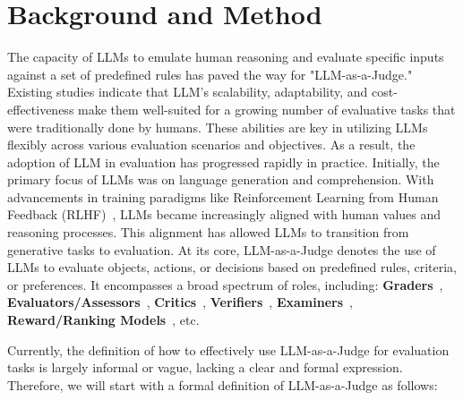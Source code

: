 \documentclass[acmsmall,screen]{acmart}
\renewcommand{\contentsname}{\centering \LARGE \textbf{Contents}}
\begin{document}








\vspace{-25pt}

\section{Background and Method}\label{sec:formulation}

The capacity of LLMs to emulate human reasoning and evaluate specific inputs against a set of predefined rules has paved the way for "LLM-as-a-Judge." Existing studies indicate that LLM's scalability, adaptability, and cost-effectiveness make them well-suited for a growing number of evaluative tasks that were traditionally done by humans. These abilities are key in utilizing LLMs flexibly across various evaluation scenarios and objectives. As a result, the adoption of LLM in evaluation has progressed rapidly in practice. Initially, the primary focus of LLMs was on language generation and comprehension. With advancements in training paradigms like Reinforcement Learning from Human Feedback (RLHF)~\cite{ouyang2022training}, LLMs became increasingly aligned with human values and reasoning processes. This alignment has allowed LLMs to transition from generative tasks to evaluation. At its core, LLM-as-a-Judge denotes the use of LLMs to evaluate objects, actions, or decisions based on predefined rules, criteria, or preferences. It encompasses a broad spectrum of roles, including:
\textbf{Graders}~\citep{trung2024reft,raft},  
\textbf{Evaluators/Assessors}~\citep{salad_bench,zhang2024evaluating},  
\textbf{Critics}~\citep{ke2024critiquellm,xiong2024llava,agentq},  
\textbf{Verifiers}~\citep{deductive_verification,nips_reflexion,speculative_rag},  
\textbf{Examiners}~\citep{lm-as-an-examiner},  
\textbf{Reward/Ranking Models}~\citep{qwen-math-reward-model,llava_rlhf,wizardmath,yuan2023rrhf}, etc.






Currently, the definition of how to effectively use LLM-as-a-Judge for evaluation tasks is largely informal or vague, lacking a clear and formal expression. Therefore, we will start with a formal definition of LLM-as-a-Judge as follows:
\end{document}
